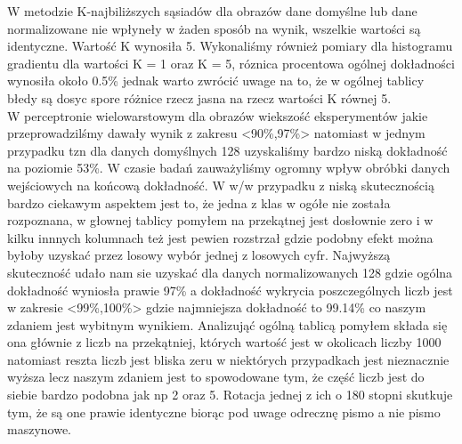 \documentclass{classrep}
\begin{document}
{        W metodzie K-najbiliższych sąsiadów dla obrazów dane domyślne lub dane normalizowane nie wpłyneły w żaden sposób
        na wynik, wszelkie wartości są identyczne. Wartość K wynosiła 5. Wykonaliśmy również pomiary dla histogramu
        gradientu dla wartości K = 1 oraz K = 5, róznica procentowa ogólnej dokładności wynosiła około 0.5\% jednak
    warto zwrócić uwage na to, że w ogólnej tablicy błedy są dosyc spore różnice rzecz jasna na rzecz wartości
    K równej 5.\\

        W perceptronie wielowarstowym dla obrazów wiekszość eksperymentów jakie przeprowadzilśmy dawały wynik z zakresu
        <90\%,97\%> natomiast w jednym przypadku tzn dla danych domyślnych 128 uzyskaliśmy bardzo niską dokładność na
    poziomie 53\%. W czasie badań zauważyliśmy ogromny wpływ obróbki danych wejściowych na końcową dokładność.
    W w/w przypadku z niską skutecznością bardzo ciekawym aspektem jest to, że jedna z klas w ogółe nie została
    rozpoznana, w głownej tablicy pomyłem na przekątnej jest dosłownie zero i w kilku innnych kolumnach też jest
    pewien rozstrzał gdzie podobny efekt można byłoby uzyskać przez losowy wybór jednej z losowych cyfr.
    Najwyższą skuteczność udało nam sie uzyskać dla danych normalizowanych 128 gdzie ogólna dokładność
    wyniosła prawie 97\% a dokładność wykrycia poszczególnych liczb jest w zakresie <99\%,100\%> gdzie najmniejsza
    dokładność to 99.14\% co naszym zdaniem jest wybitnym wynikiem. Analizująć ogólną tablicą pomyłem składa się
    ona głównie z liczb na przekątniej, których wartość jest w okolicach liczby 1000 natomiast reszta liczb jest
    bliska zeru w niektórych przypadkach jest nieznacznie wyższa lecz naszym zdaniem jest to spowodowane tym,
    że część liczb jest do siebie bardzo podobna jak np 2 oraz 5. Rotacja jednej z ich o 180 stopni skutkuje tym,
    że są one prawie identyczne biorąc pod uwage odrecznę pismo a nie pismo maszynowe.
    }
\end{document}
